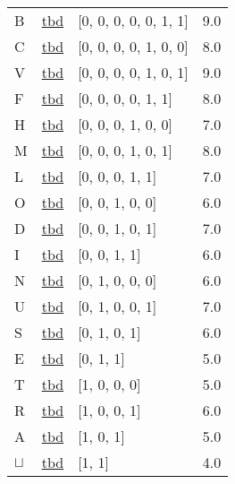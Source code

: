 \documentclass[12pt]{article}
\begin{document}
\begin{tabular}{l l l l}
B	&	\url{tbd}	&	[0, 0, 0, 0, 0, 1, 1]	&	9.0\\
C	&	\url{tbd}	&	[0, 0, 0, 0, 1, 0, 0]	&	8.0\\
V	&	\url{tbd}	&	[0, 0, 0, 0, 1, 0, 1]	&	9.0\\
F	&	\url{tbd}	&	[0, 0, 0, 0, 1, 1]	&	8.0\\
H	&	\url{tbd}	&	[0, 0, 0, 1, 0, 0]	&	7.0\\
M	&	\url{tbd}	&	[0, 0, 0, 1, 0, 1]	&	8.0\\
L	&	\url{tbd}	&	[0, 0, 0, 1, 1]	&	7.0\\
O	&	\url{tbd}	&	[0, 0, 1, 0, 0]	&	6.0\\
D	&	\url{tbd}	&	[0, 0, 1, 0, 1]	&	7.0\\
I	&	\url{tbd}	&	[0, 0, 1, 1]	&	6.0\\
N	&	\url{tbd}	&	[0, 1, 0, 0, 0]	&	6.0\\
U	&	\url{tbd}	&	[0, 1, 0, 0, 1]	&	7.0\\
S	&	\url{tbd}	&	[0, 1, 0, 1]	&	6.0\\
E	&	\url{tbd}	&	[0, 1, 1]	&	5.0\\
T	&	\url{tbd}	&	[1, 0, 0, 0]	&	5.0\\
R	&	\url{tbd}	&	[1, 0, 0, 1]	&	6.0\\
A	&	\url{tbd}	&	[1, 0, 1]	&	5.0\\
$\sqcup$	&	\url{tbd}	&	[1, 1]	&	4.0\\
\end{tabular}
\end{document}
